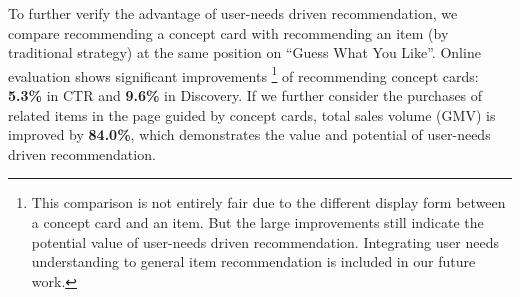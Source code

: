 To further verify the advantage of user-needs driven recommendation, 
we compare recommending a concept card with 
recommending an item (by traditional strategy)
at the same position on ``Guess What You Like''.
Online evaluation shows significant improvements \footnote{This comparison is not entirely fair due to the different display form between a concept card and an item. 
But the large improvements still indicate the potential value of user-needs driven recommendation. Integrating user needs understanding to general item recommendation is included in our future work.} of recommending concept cards:
\textbf{5.3\%} in CTR and \textbf{9.6\%} in Discovery.
If we further consider the purchases of related items in the page guided by concept cards, total sales volume (GMV) is improved by \textbf{84.0\%}, which demonstrates the value and potential of user-needs driven recommendation.









